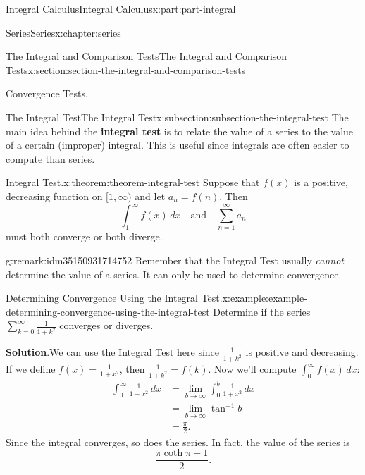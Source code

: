 \documentclass[twoside,10pt,]{book}
\newcommand{\blocktitlefont}{\relax}
\newcommand{\terminology}[1]{\textbf{#1}}
\numberwithin{equation}{part}
\newcommand{\amp}{&}
\begin{document}
\begin{partptx}{Integral Calculus}{}{Integral Calculus}{}{}{x:part:part-integral}
\begin{chapterptx}{Series}{}{Series}{}{}{x:chapter:series}
\begin{sectionptx}{The Integral and Comparison Tests}{}{The Integral and Comparison Tests}{}{}{x:section:section-the-integral-and-comparison-tests}
\begin{introduction}{Convergence Tests.}
\end{introduction}%
%
%
\typeout{************************************************}
\typeout{************************************************}
%
\begin{subsectionptx}{The Integral Test}{}{The Integral Test}{}{}{x:subsection:subsection-the-integral-test}
The main idea behind the \terminology{integral test} is to relate the value of a series to the value of a certain (improper) integral. This is useful since integrals are often easier to compute than series.%
\begin{theorem}{Integral Test.}{}{x:theorem:theorem-integral-test}%
Suppose that \(f(x)\) is a positive, decreasing function on \([1,\infty)\) and let \(a_{n} = f(n)\). Then%
\begin{equation*}
\int_{1}^{\infty}f(x)\,dx\quad\text{and}\quad \sum_{n=1}^{\infty}a_{n}
\end{equation*}
must both converge or both diverge.%
\end{theorem}
\begin{remark}{}{g:remark:idm35150931714752}%
Remember that the Integral Test usually \emph{cannot} determine the value of a series. It can only be used to determine convergence.%
\end{remark}
\begin{example}{Determining Convergence Using the Integral Test.}{x:example:example-determining-convergence-using-the-integral-test}%
Determine if the series \(\sum_{k=0}^{\infty}\frac{1}{1 + k^{2}}\) converges or diverges.%
\par\smallskip%
\noindent\textbf{\blocktitlefont Solution}.\hypertarget{g:solution:idm35150931712576}{}\quad{}We can use the Integral Test here since \(\frac{1}{1 + k^{2}}\) is positive and decreasing. If we define \(f(x) = \frac{1}{1 + x^{2}}\), then \(\frac{1}{1 + k^{2}} = f(k)\). Now we'll compute \(\int_{0}^{\infty}f(x)\,dx\):%
\begin{align*}
\int_{0}^{\infty}\frac{1}{1 + x^{2}}\,dx \amp = \lim_{b\to\infty}\int_{0}^{b}\frac{1}{1 + x^{2}}\,dx \\
\amp = \lim_{b\to\infty}\tan^{-1}b \\
\amp = \frac{\pi}{2} \text{.}
\end{align*}
Since the integral converges, so does the series. In fact, the value of the series is%
\begin{equation*}
\frac{\pi\coth\pi + 1}{2}\text{.}
\end{equation*}
%
\end{example}

\end{subsectionptx}
\end{sectionptx}
\end{chapterptx}
\end{partptx}
\end{document}
